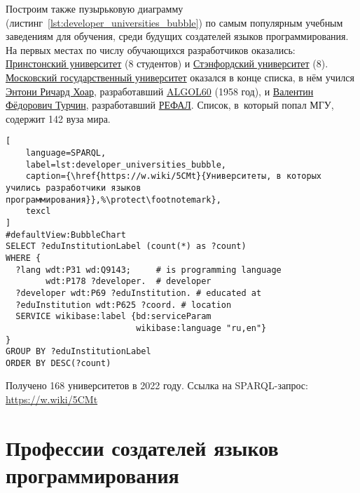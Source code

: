 Построим также пузырьковую диаграмму (листинг~\ref{lst:developer_universities_bubble}) по самым популярным учебным заведениям для обучения, среди будущих создателей языков программирования. На первых местах по числу обучающихся разработчиков оказались: \href{https://www.wikidata.org/wiki/Q21578}{Принстонский университет} (8 студентов) и \href{https://www.wikidata.org/wiki/Q41506}{Стэнфордский университет} (8). \href{https://ru.wikipedia.org/wiki/Московский_государственный_университет}{Московский государственный университет} оказался в конце списка, в нём учился \href{https://www.wikidata.org/wiki/Q92602}{Энтони Ричард Хоар}, разработавший \href{https://www.wikidata.org/wiki/Q188436}{ALGOL60} (1958 год), и \href{https://www.wikidata.org/wiki/Q4466506}{Валентин Фёдорович Турчин}, разработавший \href{https://www.wikidata.org/wiki/Q2626418}{РЕФАЛ}. 
Список, в~который попал МГУ, содержит 142 вуза мира.
%
%
\begin{marginfigure}[-12\baselineskip]
\begin{lstlisting}[
	language=SPARQL,
	label=lst:developer_universities_bubble,
    caption={\href{https://w.wiki/5CMt}{Университеты, в которых учились разработчики языков программирования}},%\protect\footnotemark},
	texcl
]
#defaultView:BubbleChart
SELECT ?eduInstitutionLabel (count(*) as ?count) 
WHERE {
  ?lang wdt:P31 wd:Q9143;     # is programming language
        wdt:P178 ?developer.  # developer
  ?developer wdt:P69 ?eduInstitution. # educated at
  ?eduInstitution wdt:P625 ?coord. # location
  SERVICE wikibase:label {bd:serviceParam 
                          wikibase:language "ru,en"}
}
GROUP BY ?eduInstitutionLabel
ORDER BY DESC(?count)
\end{lstlisting}
Получено \num{168} университетов в 2022 году. Ссылка на SPARQL-запрос: \href{https://w.wiki/5CMt}{https://w.wiki/5CMt}
\end{marginfigure}




\newpage
\section{Профессии создателей языков программирования}

